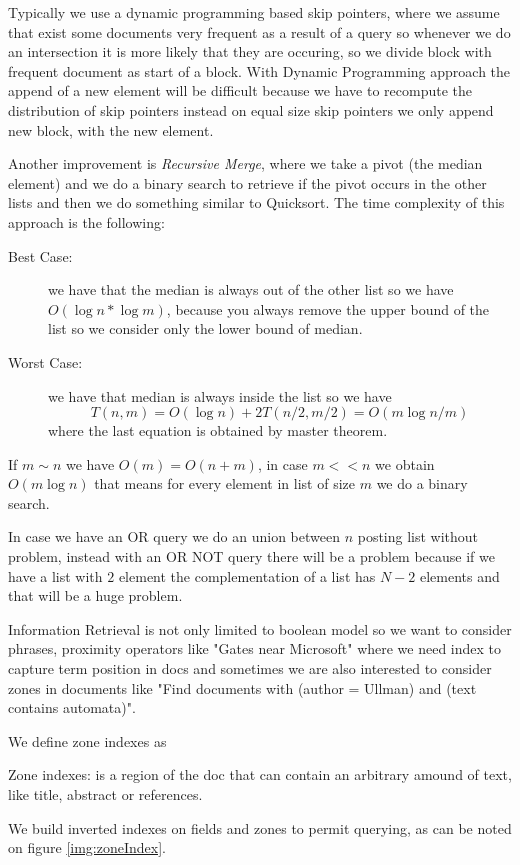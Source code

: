 Typically we use a dynamic programming based skip pointers, where we assume that exist some documents 
very frequent as a result of a query so whenever we do an intersection it is more likely that they are occuring,
so we divide block with frequent document as start of a block.\newline
With Dynamic Programming approach the append of a new element will be difficult because we have to recompute
the distribution of skip pointers instead on equal size skip pointers we only append new block, with the new element.

Another improvement is \emph{Recursive Merge}, where we take a pivot (the median element) and we do a 
binary search to retrieve if the pivot occurs in the other lists and then we do something similar to Quicksort.\newline
The time complexity of this approach is the following:
\begin{description}
    \item [Best Case: ] we have that the median is always out of the other list so we have $O(\log n * \log m)$, 
	                because you always remove the upper bound of the list so we consider only the lower bound of median.
    \item [Worst Case: ] we have that median is always inside the list so we have 
			 \[ T(n, m) = O(\log n) + 2T(n/2, m/2) = O(m \log n/m) \]
			 where the last equation is obtained by master theorem.
\end{description}
If $m \sim n$ we have $O(m) = O(n + m)$, in case $m << n$ we obtain $O(m \log n)$ that means for every element in list
of size $m$ we do a binary search.

In case we have an OR query we do an union between $n$ posting list without problem, instead with an OR NOT query
there will be a problem because if we have a list with $2$ element the complementation of a list has $N - 2$ 
elements and that will be a huge problem. 

Information Retrieval is not only limited to boolean model so we want to consider phrases, proximity operators
like "Gates near Microsoft" where we need index to capture term position in docs and sometimes we are also 
interested to consider zones in documents like "Find documents with (author = Ullman) and (text contains automata)".

We define zone indexes as
\begin{defi}
    Zone indexes: is a region of the doc that can contain an arbitrary amound of text, like title, abstract
                  or references.
\end{defi}
We build inverted indexes on fields and zones to permit querying, as can be noted on figure \ref{img:zoneIndex}.

